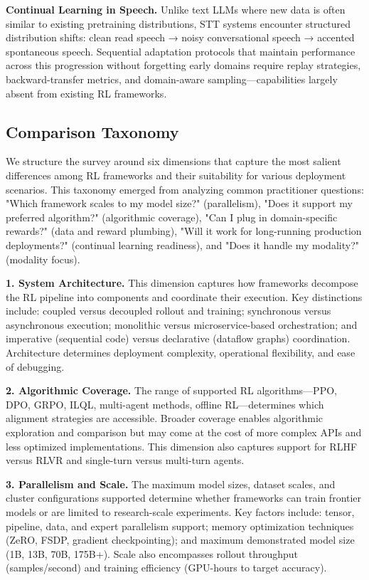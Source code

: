 \documentclass[conference]{IEEEtran}
\begin{document}
\textbf{Continual Learning in Speech.} Unlike text LLMs where new data is often similar to existing pretraining distributions, STT systems encounter structured distribution shifts: clean read speech → noisy conversational speech → accented spontaneous speech. Sequential adaptation protocols that maintain performance across this progression without forgetting early domains require replay strategies, backward-transfer metrics, and domain-aware sampling—capabilities largely absent from existing RL frameworks.

\subsection{Comparison Taxonomy}

We structure the survey around six dimensions that capture the most salient differences among RL frameworks and their suitability for various deployment scenarios. This taxonomy emerged from analyzing common practitioner questions: "Which framework scales to my model size?" (parallelism), "Does it support my preferred algorithm?" (algorithmic coverage), "Can I plug in domain-specific rewards?" (data and reward plumbing), "Will it work for long-running production deployments?" (continual learning readiness), and "Does it handle my modality?" (modality focus).

\textbf{1. System Architecture.} This dimension captures how frameworks decompose the RL pipeline into components and coordinate their execution. Key distinctions include: coupled versus decoupled rollout and training; synchronous versus asynchronous execution; monolithic versus microservice-based orchestration; and imperative (sequential code) versus declarative (dataflow graphs) coordination. Architecture determines deployment complexity, operational flexibility, and ease of debugging.

\textbf{2. Algorithmic Coverage.} The range of supported RL algorithms—PPO, DPO, GRPO, ILQL, multi-agent methods, offline RL—determines which alignment strategies are accessible. Broader coverage enables algorithmic exploration and comparison but may come at the cost of more complex APIs and less optimized implementations. This dimension also captures support for RLHF versus RLVR and single-turn versus multi-turn agents.

\textbf{3. Parallelism and Scale.} The maximum model sizes, dataset scales, and cluster configurations supported determine whether frameworks can train frontier models or are limited to research-scale experiments. Key factors include: tensor, pipeline, data, and expert parallelism support; memory optimization techniques (ZeRO, FSDP, gradient checkpointing); and maximum demonstrated model size (1B, 13B, 70B, 175B+). Scale also encompasses rollout throughput (samples/second) and training efficiency (GPU-hours to target accuracy).
\end{document}
